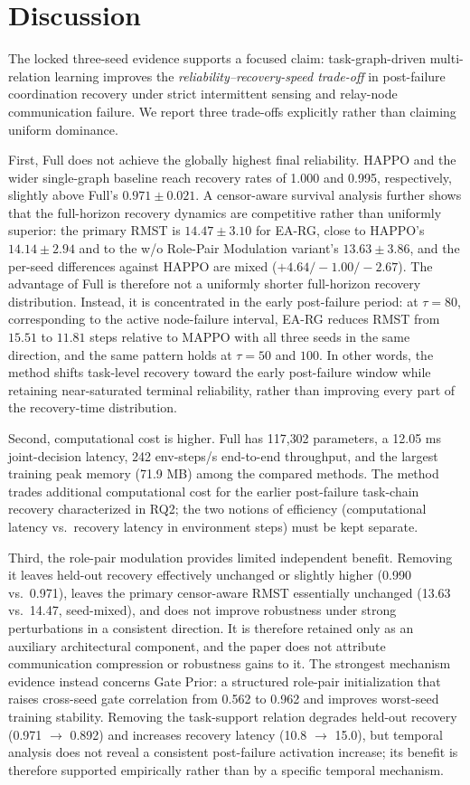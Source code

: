 \section{Discussion}

The locked three-seed evidence supports a focused claim: task-graph-driven multi-relation learning improves the \emph{reliability--recovery-speed trade-off} in post-failure coordination recovery under strict intermittent sensing and relay-node communication failure. We report three trade-offs explicitly rather than claiming uniform dominance.

First, Full does not achieve the globally highest final reliability. HAPPO and the wider single-graph baseline reach recovery rates of 1.000 and 0.995, respectively, slightly above Full's $0.971 \pm 0.021$. A censor-aware survival analysis further shows that the full-horizon recovery dynamics are competitive rather than uniformly superior: the primary RMST is $14.47 \pm 3.10$ for EA-RG, close to HAPPO's $14.14 \pm 2.94$ and to the w/o Role-Pair Modulation variant's $13.63 \pm 3.86$, and the per-seed differences against HAPPO are mixed ($+4.64 / -1.00 / -2.67$). The advantage of Full is therefore not a uniformly shorter full-horizon recovery distribution. Instead, it is concentrated in the early post-failure period: at $\tau = 80$, corresponding to the active node-failure interval, EA-RG reduces RMST from $15.51$ to $11.81$ steps relative to MAPPO with all three seeds in the same direction, and the same pattern holds at $\tau = 50$ and $100$. In other words, the method shifts task-level recovery toward the early post-failure window while retaining near-saturated terminal reliability, rather than improving every part of the recovery-time distribution.

Second, computational cost is higher. Full has 117{,}302 parameters, a 12.05 ms joint-decision latency, 242 env-steps/s end-to-end throughput, and the largest training peak memory (71.9 MB) among the compared methods. The method trades additional computational cost for the earlier post-failure task-chain recovery characterized in RQ2; the two notions of efficiency (computational latency vs.\ recovery latency in environment steps) must be kept separate.

Third, the role-pair modulation provides limited independent benefit. Removing it leaves held-out recovery effectively unchanged or slightly higher (0.990 vs.\ 0.971), leaves the primary censor-aware RMST essentially unchanged (13.63 vs.\ 14.47, seed-mixed), and does not improve robustness under strong perturbations in a consistent direction. It is therefore retained only as an auxiliary architectural component, and the paper does not attribute communication compression or robustness gains to it. The strongest mechanism evidence instead concerns Gate Prior: a structured role-pair initialization that raises cross-seed gate correlation from 0.562 to 0.962 and improves worst-seed training stability. Removing the task-support relation degrades held-out recovery (0.971 $\rightarrow$ 0.892) and increases recovery latency (10.8 $\rightarrow$ 15.0), but temporal analysis does not reveal a consistent post-failure activation increase; its benefit is therefore supported empirically rather than by a specific temporal mechanism.

